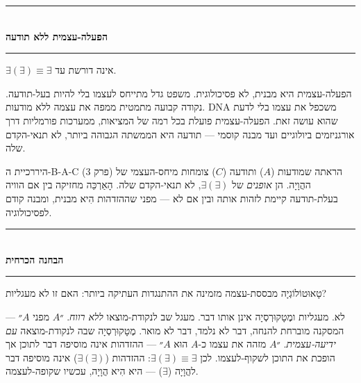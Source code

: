 \documentclass[10pt, openany, oneside]{book}
\renewcommand{\normalsize}{\fontsize{10}{13}\selectfont}
\begin{document}
\vspace{1.5em}


\begin{center}
    \rule{0.3\textwidth}{0.4pt}\\[0.5em]
    {\normalsize\bfseries\textsc{הפעלה-עצמית ללא תודעה}}\\[0.3em]
    \rule{0.3\textwidth}{0.4pt}
\end{center}

\vspace{1em}

\noindent $\exists(\exists) \equiv \exists$ אינה דורשת עד.

הפעלה-עצמית היא מבנית, לא פסיכולוגית. משפט גדל מתייחס לעצמו בלי להיות בעל-תודעה. נקודה קבועה מתמטית ממפה את עצמה ללא מודעות. DNA משכפל את עצמו בלי לדעת שהוא עושה זאת. הפעלה-עצמית פועלת בכל רמה של המציאות, ממערכות פורמליות דרך אורגניזמים ביולוגיים ועד מבנה קוסמי — תודעה היא הממשתה הגבוהה ביותר, לא תנאי-הקדם שלה.

היררכיית ה-B-A-C (פרק 3) הראתה שמודעות ($A$) ותודעה ($C$) צומחות מיחס-העצמי של ההֲוָיָה. הן \textit{אופנים} של $\exists(\exists)$, לא תנאי-הקדם שלה. הָאַרְכֵּה מחזיקה בין אם הוויה בעלת-תודעה קיימת לזהות אותה ובין אם לא — מפני שההזדהות הִיא מבנית, ומבנה קודם לפסיכולוגיה.

\vspace{1.5em}


\begin{center}
    \rule{0.3\textwidth}{0.4pt}\\[0.5em]
    {\normalsize\bfseries\textsc{הבחנה הכרחית}}\\[0.3em]
    \rule{0.3\textwidth}{0.4pt}
\end{center}

\vspace{1em}

\noindent טָאוּטוֹלוֹגְיָה מבססת-עצמה מזמינה את ההתנגדות העתיקה ביותר: האם זו לא מעגליות?

לא. מעגליות ומֶטָקוּרְסְיָה אינן אותו דבר. מעגל שב לנקודת-מוצאו \textit{ללא רווח}. ״$A$ מפני $A$״ — המסקנה מוברחת להנחה, דבר לא נלמד, דבר לא מואר. מֶטָקוּרְסְיָה שבה לנקודת-מוצאה \textit{עם ידיעה-עצמית}. ״$A$ מזהה את עצמו כ-$A$ הוּא $A$״ — ההזדהות אינה מוסיפה דבר לתוכן אך הופכת את התוכן לשקוף-לעצמו. לכן $\exists(\exists) \equiv \exists$: ההזדהות ($\exists(\exists)$) אינה מוסיפה דבר להֲוָיָה ($\exists$) — היא הִיא הֲוָיָה, עכשיו שקופה-לעצמה.
\end{document}
